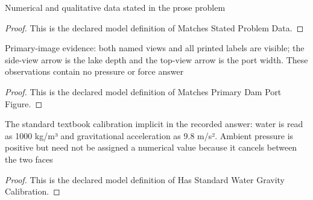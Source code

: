 \begin{definition}
  \label{def:physics:phyx-mini-0392:phyxminiproblems-problemphyxmini0392-matchesstatedproblemdata}
  Numerical and qualitative data stated in the prose problem
\end{definition}
\begin{proof}
  This is the declared model definition of Matches Stated Problem Data.
\end{proof}
\begin{definition}
  \label{def:physics:phyx-mini-0392:phyxminiproblems-problemphyxmini0392-matchesprimarydamportfigure}
  Primary-image evidence: both named views and all printed labels are visible; the side-view arrow is the lake depth and the top-view arrow is the port width. These observations contain no pressure or force answer
\end{definition}
\begin{proof}
  This is the declared model definition of Matches Primary Dam Port Figure.
\end{proof}
\begin{definition}
  \label{def:physics:phyx-mini-0392:phyxminiproblems-problemphyxmini0392-hasstandardwatergravitycalibration}
  The standard textbook calibration implicit in the recorded answer: water is read as 1000 kg/m³ and gravitational acceleration as 9.8 m/s². Ambient pressure is positive but need not be assigned a numerical value because it cancels between the two faces
\end{definition}
\begin{proof}
  This is the declared model definition of Has Standard Water Gravity Calibration.
\end{proof}
